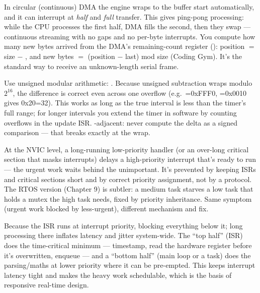 In circular (continuous) DMA the engine wraps to the buffer start
automatically, and it can interrupt at \emph{half} and \emph{full} transfer.
This gives ping-pong processing: while the CPU processes the first half, DMA
fills the second, then they swap --- continuous streaming with no gaps and no
per-byte interrupts. You compute how many new bytes arrived from the DMA's
remaining-count register (): position $=$ size $-$ , and
new bytes $=$ (position $-$ last) mod size (Coding Gym). It's the standard way
to receive an unknown-length serial frame.

Use unsigned modular arithmetic: . Because
unsigned subtraction wraps modulo $2^{16}$, the difference is correct even
across one overflow (e.g.\ =0xFFF0, =0x0010 gives 0x20=32).
This works as long as the true interval is less than the timer's full range; for
longer intervals you extend the timer in software by counting overflows in the
update ISR. \trap-adjacent: never compute the delta as a signed comparison ---
that breaks exactly at the wrap.

At the NVIC level, a long-running low-priority handler (or an over-long
critical section that masks interrupts) delays a high-priority interrupt that's
ready to run --- the urgent work waits behind the unimportant. It's prevented by
keeping ISRs and critical sections short and by correct priority assignment, not
by a protocol. The RTOS version (Chapter 9) is subtler: a medium task starves a
low task that holds a mutex the high task needs, fixed by priority inheritance.
Same symptom (urgent work blocked by less-urgent), different mechanism and fix.

Because the ISR runs at interrupt priority, blocking everything below it; long
processing there inflates latency and jitter system-wide. The ``top half'' (ISR)
does the time-critical minimum --- timestamp, read the hardware register before
it's overwritten, enqueue --- and a ``bottom half'' (main loop or a task) does
the parsing/maths at lower priority where it can be pre-empted. This keeps
interrupt latency tight and makes the heavy work schedulable, which is the basis
of responsive real-time design.

